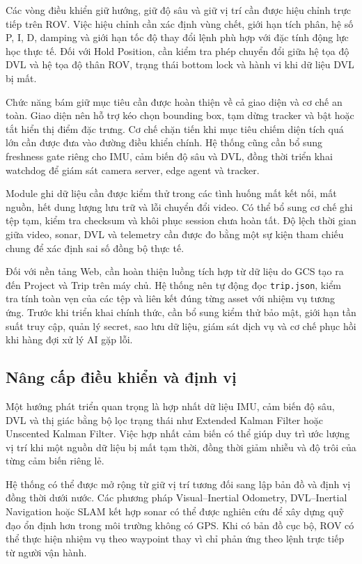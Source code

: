 \documentclass[../DoAn.tex]{subfiles}
\begin{document}
Các vòng điều khiển giữ hướng, giữ độ sâu và giữ vị trí cần được hiệu chỉnh trực tiếp trên ROV. Việc hiệu chỉnh cần xác định vùng chết, giới hạn tích phân, hệ số P, I, D, damping và giới hạn tốc độ thay đổi lệnh phù hợp với đặc tính động lực học thực tế. Đối với Hold Position, cần kiểm tra phép chuyển đổi giữa hệ tọa độ DVL và hệ tọa độ thân ROV, trạng thái bottom lock và hành vi khi dữ liệu DVL bị mất.

Chức năng bám giữ mục tiêu cần được hoàn thiện về cả giao diện và cơ chế an toàn. Giao diện nên hỗ trợ kéo chọn bounding box, tạm dừng tracker và bật hoặc tắt hiển thị điểm đặc trưng. Cơ chế chặn tiến khi mục tiêu chiếm diện tích quá lớn cần được đưa vào đường điều khiển chính. Hệ thống cũng cần bổ sung freshness gate riêng cho IMU, cảm biến độ sâu và DVL, đồng thời triển khai watchdog để giám sát camera server, edge agent và tracker.

Module ghi dữ liệu cần được kiểm thử trong các tình huống mất kết nối, mất nguồn, hết dung lượng lưu trữ và lỗi chuyển đổi video. Có thể bổ sung cơ chế ghi tệp tạm, kiểm tra checksum và khôi phục session chưa hoàn tất. Độ lệch thời gian giữa video, sonar, DVL và telemetry cần được đo bằng một sự kiện tham chiếu chung để xác định sai số đồng bộ thực tế.

Đối với nền tảng Web, cần hoàn thiện luồng tích hợp từ dữ liệu do GCS tạo ra đến Project và Trip trên máy chủ. Hệ thống nên tự động đọc \texttt{trip.json}, kiểm tra tính toàn vẹn của các tệp và liên kết đúng từng asset với nhiệm vụ tương ứng. Trước khi triển khai chính thức, cần bổ sung kiểm thử bảo mật, giới hạn tần suất truy cập, quản lý secret, sao lưu dữ liệu, giám sát dịch vụ và cơ chế phục hồi khi hàng đợi xử lý AI gặp lỗi.

\subsection{Nâng cấp điều khiển và định vị}

Một hướng phát triển quan trọng là hợp nhất dữ liệu IMU, cảm biến độ sâu, DVL và thị giác bằng bộ lọc trạng thái như Extended Kalman Filter hoặc Unscented Kalman Filter. Việc hợp nhất cảm biến có thể giúp duy trì ước lượng vị trí khi một nguồn dữ liệu bị mất tạm thời, đồng thời giảm nhiễu và độ trôi của từng cảm biến riêng lẻ.

Hệ thống có thể được mở rộng từ giữ vị trí tương đối sang lập bản đồ và định vị đồng thời dưới nước. Các phương pháp Visual--Inertial Odometry, DVL--Inertial Navigation hoặc SLAM kết hợp sonar có thể được nghiên cứu để xây dựng quỹ đạo ổn định hơn trong môi trường không có GPS. Khi có bản đồ cục bộ, ROV có thể thực hiện nhiệm vụ theo waypoint thay vì chỉ phản ứng theo lệnh trực tiếp từ người vận hành.
\end{document}
